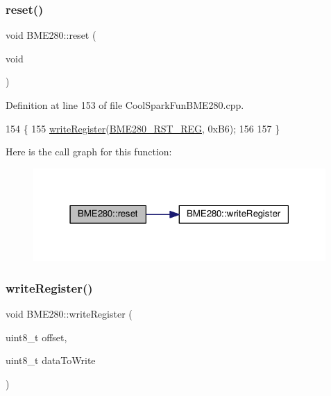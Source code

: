 \subsubsection{\texorpdfstring{reset()}{reset()}}
{\footnotesize\ttfamily void B\+M\+E280\+::reset (\begin{DoxyParamCaption}\item[{void}]{ }\end{DoxyParamCaption})}



Definition at line 153 of file Cool\+Spark\+Fun\+B\+M\+E280.\+cpp.


\begin{DoxyCode}
154 \{
155     \hyperlink{class_b_m_e280_afcff21c342725246bf415d7f0e4d04f0}{writeRegister}(\hyperlink{_cool_spark_fun_b_m_e280_8h_a58ebcaa8ff137ca7e8704dbfb70dff57}{BME280\_RST\_REG}, 0xB6);
156     
157 \}
\end{DoxyCode}
Here is the call graph for this function\+:\nopagebreak
\begin{figure}[H]
\begin{center}
\leavevmode
\includegraphics[width=316pt]{df/dcf/class_b_m_e280_aeec5deb6daace6ae390108b4210e9df7_cgraph}
\end{center}
\end{figure}
\mbox{\label{class_b_m_e280_afcff21c342725246bf415d7f0e4d04f0}} 
\subsubsection{\texorpdfstring{write\+Register()}{writeRegister()}}
{\footnotesize\ttfamily void B\+M\+E280\+::write\+Register (\begin{DoxyParamCaption}\item[{uint8\+\_\+t}]{offset,  }\item[{uint8\+\_\+t}]{data\+To\+Write }\end{DoxyParamCaption})}



